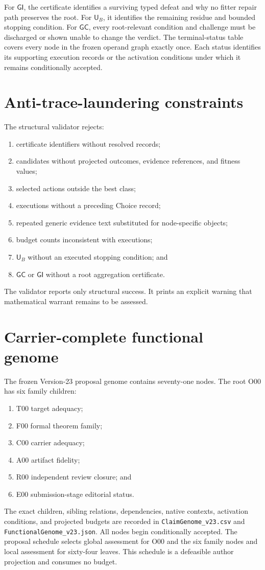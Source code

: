\documentclass[10pt]{article}
\newcommand{\GC}{\mathsf{GC}}
\newcommand{\GI}{\mathsf{GI}}
\newcommand{\UB}{\mathsf{U}_B}
\begin{document}
For $\GI$, the certificate identifies a surviving typed defeat and why no fitter repair path preserves the root.  For $\UB$, it identifies the remaining residue and bounded stopping condition.  For $\GC$, every root-relevant condition and challenge must be discharged or shown unable to change the verdict.  The terminal-status table covers every node in the frozen operand graph exactly once.  Each status identifies its supporting execution records or the activation conditions under which it remains conditionally accepted.

\section{Anti-trace-laundering constraints}

The structural validator rejects:
\begin{enumerate}
  \item certificate identifiers without resolved records;
  \item candidates without projected outcomes, evidence references, and fitness values;
  \item selected actions outside the best class;
  \item executions without a preceding Choice record;
  \item repeated generic evidence text substituted for node-specific objects;
  \item budget counts inconsistent with executions;
  \item $\UB$ without an executed stopping condition; and
  \item $\GC$ or $\GI$ without a root aggregation certificate.
\end{enumerate}

The validator reports only structural success.  It prints an explicit warning that mathematical warrant remains to be assessed.


\section{Carrier-complete functional genome}

The frozen Version-23 proposal genome contains seventy-one nodes.  The root O00 has six family children:
\begin{enumerate}
  \item T00 target adequacy;
  \item F00 formal theorem family;
  \item C00 carrier adequacy;
  \item A00 artifact fidelity;
  \item R00 independent review closure; and
  \item E00 submission-stage editorial status.
\end{enumerate}
The exact children, sibling relations, dependencies, native contexts, activation conditions, and projected budgets are recorded in \texttt{ClaimGenome\_v23.csv} and \texttt{FunctionalGenome\_v23.json}.  All nodes begin conditionally accepted.  The proposal schedule selects global assessment for O00 and the six family nodes and local assessment for sixty-four leaves.  This schedule is a defeasible author projection and consumes no budget.
\end{document}
